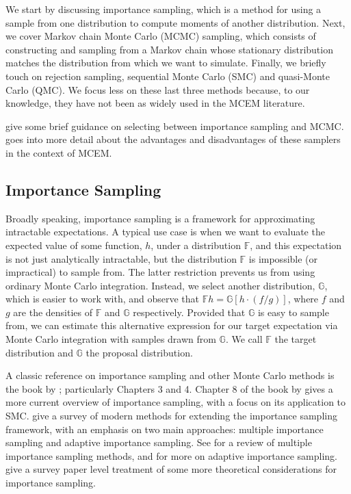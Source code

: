 \documentclass[11pt, oneside]{article}   	%
\newcommand{\bF}{\mathbb{F}}
\newcommand{\bG}{\mathbb{G}}
\begin{document}
We start by discussing importance sampling, which is a method for using a sample from one distribution to compute moments of another distribution. Next, we cover Markov chain Monte Carlo (MCMC) sampling, which consists of constructing and sampling from a Markov chain whose stationary distribution matches the distribution from which we want to simulate. Finally, we briefly touch on rejection sampling, sequential Monte Carlo (SMC) and quasi-Monte Carlo (QMC). We focus less on these last three methods because, to our knowledge, they have not been as widely used in the MCEM literature.

\citet{Dey99} give some brief guidance on selecting between importance sampling and MCMC. \citet{Jan06II} goes into more detail about the advantages and disadvantages of these samplers in the context of MCEM. 

\subsection{Importance Sampling}
\label{sec:imp_samp}

Broadly speaking, importance sampling is a framework for approximating intractable expectations. A typical use case is when we want to evaluate the expected value of some function, $h$, under a distribution $\bF$, and this expectation is not just analytically intractable, but the distribution $\bF$ is impossible (or impractical) to sample from. The latter restriction prevents us from using ordinary Monte Carlo integration. Instead, we select another distribution, $\bG$, which is easier to work with, and observe that $\bF h = \bG [h \cdot (f/g)]$, where $f$ and $g$ are the densities of $\bF$ and $\bG$ respectively. Provided that $\bG$ is easy to sample from, we can estimate this alternative expression for our target expectation via Monte Carlo integration with samples drawn from $\bG$. We call $\bF$ the target distribution and $\bG$ the proposal distribution.  

A classic reference on importance sampling and other Monte Carlo methods is the book by \citet{Rob04}; particularly Chapters 3 and 4. Chapter 8 of the book by \citet{Cho20} gives a more current overview of importance sampling, with a focus on its application to SMC. \citet{Elv22} give a survey of modern methods for extending the importance sampling framework, with an emphasis on two main approaches: multiple importance sampling and adaptive importance sampling. See \citet{Elv19} for a review of multiple importance sampling methods, and \citet{Bug17} for more on adaptive importance sampling. \citet{Aga17} give a survey paper level treatment of some more theoretical considerations for importance sampling.
\end{document}
